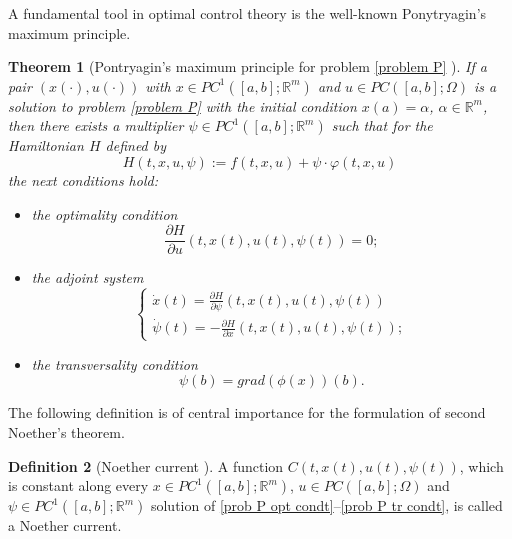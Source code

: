 \documentclass{my-aims}
\newtheorem{theorem}{Theorem}[section]
\theoremstyle{definition}
\newtheorem{definition}[theorem]{Definition}
\begin{document}
A fundamental tool in optimal control theory 
is the well-known Ponytryagin's maximum principle.

\begin{theorem}[Pontryagin's maximum principle
for problem \eqref{problem P} \cite{Pontryagin}]
\label{PMP}
If a pair $(x(\cdot),u(\cdot))$ with
$x \in PC^1([a,b]; \mathbb{R}^m)$ and $u\in PC([a,b];\Omega)$
is a solution to problem \eqref{problem P} with the initial condition $x(a)=\alpha$,
$\alpha \in \mathbb{R}^m$, then there exists a multiplier $\psi \in PC^1([a,b];\mathbb{R}^m)$
such that for the Hamiltonian $H$ defined by
\begin{equation}
\label{eq:def:Hamiltonian}
H(t,x,u,\psi):=f(t,x,u)+\psi\cdot \varphi(t,x,u)
\end{equation}
the next conditions hold:
\begin{itemize}
\item the optimality condition
\begin{equation}
\label{prob P opt condt}
\frac{\partial H}{\partial u}(t, x(t),u(t), \psi(t))=0;
\end{equation}
		
\item the adjoint system
\begin{equation}
\label{prob P adj syst}
\begin{cases}
\dot{x}(t)=\frac{\partial H}{\partial \psi}(t, x(t),u(t), \psi(t))\\
\dot{\psi}(t)=-\frac{\partial H}{\partial x}(t, x(t),u(t), \psi(t));
\end{cases}
\end{equation}
		
\item the transversality condition
\begin{equation}
\label{prob P tr condt}
\psi(b)=grad(\phi(x))(b).
\end{equation}
\end{itemize}
\end{theorem}

The following definition is of central importance 
for the formulation of second Noether's theorem.

\begin{definition}[Noether current \cite{Torres2003MR1980565}]
A function $C(t,x(t),u(t), \psi(t))$, which is constant along 
every $x \in PC^1([a,b];\mathbb{R}^m)$, $u\in PC([a,b];\Omega)$ and
$\psi \in PC^1([a,b];\mathbb{R}^m)$ solution of 
\eqref{prob P opt condt}--\eqref{prob P tr condt},
is called a Noether current.
\end{definition}
\end{document}
